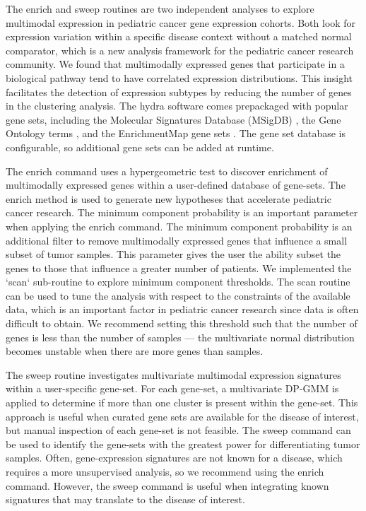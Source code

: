\documentclass[10pt,letterpaper]{article}
\begin{document}
The enrich and sweep routines are two independent analyses to explore multimodal expression in pediatric cancer gene expression cohorts. Both look for expression variation within a specific disease context without a matched normal comparator, which is a new analysis framework for the pediatric cancer research community. We found that multimodally expressed genes that participate in a biological pathway tend to have correlated expression distributions. This insight facilitates the detection of expression subtypes by reducing the number of genes in the clustering analysis. The hydra software comes prepackaged with popular gene sets, including the Molecular Signatures Database (MSigDB) \cite{liberzonMolecularSignaturesDatabase2011}, the Gene Ontology terms \cite{ashburnerGeneOntologyTool2000, gene2018gene}, and the EnrichmentMap gene sets \cite{merico2010enrichment}. The gene set database is configurable, so additional gene sets can be added at runtime.

The enrich command uses a hypergeometric test \cite{yuClusterProfilerPackageComparing2012} to discover enrichment of multimodally expressed genes within a user-defined database of gene-sets. The enrich method is used to generate new hypotheses that accelerate pediatric cancer research. The minimum component probability is an important parameter when applying the enrich command. The minimum component probability is an additional filter to remove multimodally expressed genes that influence a small subset of tumor samples. This parameter gives the user the ability subset the genes to those that influence a greater number of patients. We implemented the `scan` sub-routine to explore minimum component thresholds. The scan routine can be used to tune the analysis with respect to the constraints of the available data, which is an important factor in pediatric cancer research since data is often difficult to obtain. We recommend setting this threshold such that the number of genes is less than the number of samples --- the multivariate normal distribution becomes unstable when there are more genes than samples.

The sweep routine investigates multivariate multimodal expression signatures within a user-specific gene-set. For each gene-set, a multivariate DP-GMM is applied to determine if more than one cluster is present within the gene-set. This approach is useful when curated gene sets are available for the disease of interest, but manual inspection of each gene-set is not feasible. The sweep command can be used to identify the gene-sets with the greatest power for differentiating tumor samples. Often, gene-expression signatures are not known for a disease, which requires a more unsupervised analysis, so we recommend using the enrich command. However, the sweep command is useful when integrating known signatures that may translate to the disease of interest.
\end{document}
